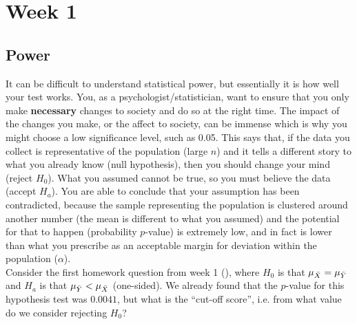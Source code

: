 \clearpage
{}
\section*{Week 1}

\subsection*{Power}
It can be difficult to understand statistical power, but essentially it is how well your test works. You, as a psychologist/statistician, want to ensure that you only make \textbf{necessary} changes to society and do so at the right time. The impact of the changes you make, or the affect to society, can be immense which is why you might choose a low significance level, such as 0.05. This says that, if the data you collect is representative of the population (large $n$) and it tells a different story to what you already know (null hypothesis), then you should change your mind (reject $H_0$). What you assumed cannot be true, so you must believe the data (accept $H_a$). You are able to conclude that your assumption has been contradicted, because the sample representing the population is clustered around another number (the mean is different to what you assumed) and the potential for that to happen (probability $p$-value) is extremely low, and in fact is lower than what you prescribe as an acceptable margin for deviation within the population ($\alpha$). \\
Consider the first homework question from week 1 (), where $H_0$ is that $\mu_{\Bar{X}} = \mu_{\Bar{Y}}$ and $H_a$ is that $\mu_{\Bar{Y}} < \mu_{\Bar{X}}$ (one-sided). We already found that the $p$-value for this hypothesis test was $0.0041$, but what is the ``cut-off score'', i.e. from what value do we consider rejecting $H_0$?
